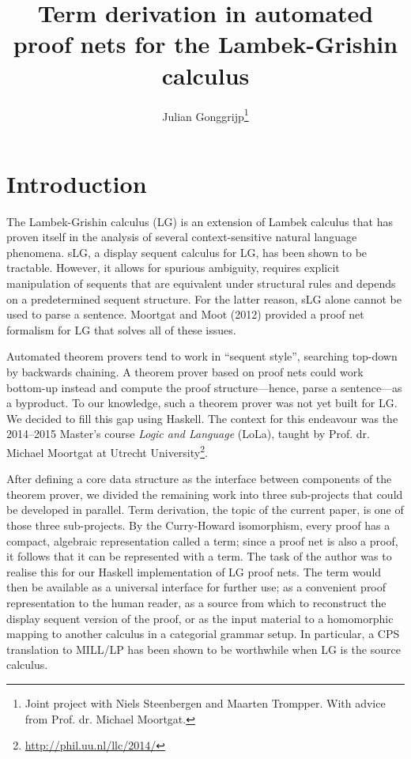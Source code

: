 \documentclass[12pt,a4paper]{article}
\begin{document}
\title{Term derivation in automated proof nets for the Lambek-Grishin calculus}
\author{Julian Gonggrijp\thanks{Joint project with Niels Steenbergen and Maarten Trompper. With advice from Prof. dr. Michael Moortgat.}}
\date{}
\maketitle


\section{Introduction}

The Lambek-Grishin calculus (LG) is an extension of Lambek calculus that has proven itself in the analysis of several context-sensitive natural language phenomena. sLG, a display sequent calculus for LG, has been shown to be tractable. \cite{m09} However, it allows for spurious ambiguity, requires explicit manipulation of sequents that are equivalent under structural rules and depends on a predetermined sequent structure. For the latter reason, sLG alone cannot be used to parse a sentence. Moortgat and Moot (2012) provided a proof net formalism for LG that solves all of these issues. \cite{mm12}

Automated theorem provers tend to work in ``sequent style'', searching top-down by backwards chaining. A theorem prover based on proof nets could work bottom-up instead and compute the proof structure---hence, parse a sentence---as a byproduct. To our knowledge, such a theorem prover was not yet built for LG. We decided to fill this gap using Haskell. The context for this endeavour was the 2014--2015 Master's course \emph{Logic and Language} (LoLa), taught by Prof. dr. Michael Moortgat at Utrecht University\footnote{\url{http://phil.uu.nl/llc/2014/}}.

After defining a core data structure as the interface between components of the theorem prover, we divided the remaining work into three sub-projects that could be developed in parallel. Term derivation, the topic of the current paper, is one of those three sub-projects. By the Curry-Howard isomorphism, every proof has a compact, algebraic representation called a term; since a proof net is also a proof, it follows that it can be represented with a term. The task of the author was to realise this for our Haskell implementation of LG proof nets. The term would then be available as a universal interface for further use; as a convenient proof representation to the human reader, as a source from which to reconstruct the display sequent version of the proof, or as the input material to a homomorphic mapping to another calculus in a categorial grammar setup. In particular, a CPS translation to MILL/LP has been shown to be worthwhile when LG is the source calculus. \cite{mm12}
\end{document}
